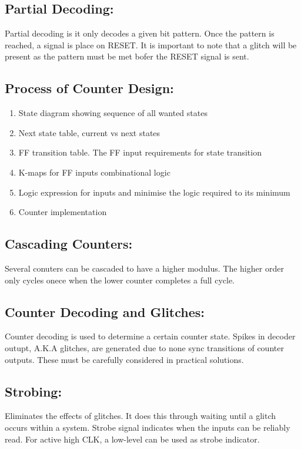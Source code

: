 \documentclass[a5paper]{article}
\begin{document}
	\subsection{Partial Decoding:}
	Partial decoding is it only decodes a given bit pattern. Once the pattern is reached, a signal is place on RESET. It is important to note that a glitch will be present as the pattern must be met bofer the RESET signal is sent.

	\subsection{Process of Counter Design:}
	\begin{enumerate}
		\item State diagram showing sequence of all wanted states
		\item Next state table, current vs next states
		\item FF transition table. The FF input requirements for state transition
		\item K-maps for FF inputs combinational logic
		\item Logic expression for inputs and minimise the logic required to its minimum
		\item Counter implementation
	\end{enumerate}

	\subsection{Cascading Counters:}
	Several conuters can be cascaded to have a higher modulus. The higher order only cycles onece when the lower counter completes a full cycle.

	\subsection{Counter Decoding and Glitches:}
	Counter decoding is used to determine a certain counter state. Spikes in decoder outupt, A.K.A glitches, are generated due to none sync transitions of counter outputs. These must be carefully considered in practical solutions.

	\subsection{Strobing:}
	Eliminates the effects of glitches. It does this through waiting until a glitch occurs within a system. Strobe signal indicates when the inputs can be reliably read. For active high CLK, a low-level can be used as strobe indicator.
\end{document}
